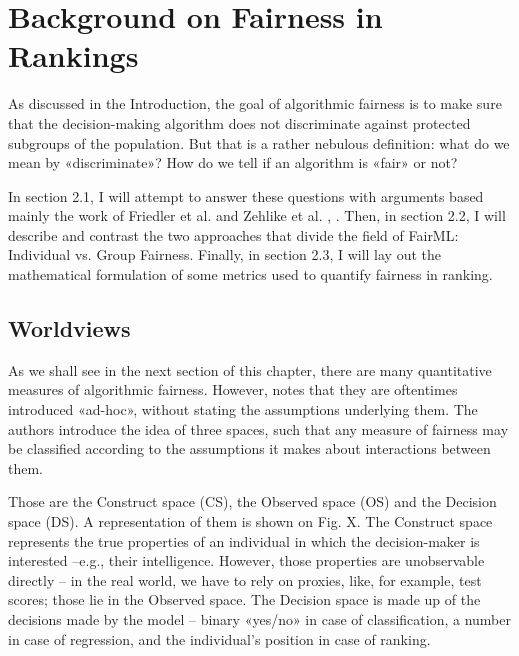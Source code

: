 
	
\newcommand{\ind}{\perp \!\!\! \perp}
\newcommand{\exposure}[1]{\textrm{Exposure}(#1|\mathbf{P})}

\chapter{Background on Fairness in Rankings}\label{chapt:background}


As discussed in the Introduction, the goal of algorithmic fairness is to make sure that the decision-making algorithm does not discriminate against protected subgroups of the population. But that is a rather nebulous definition: what do we mean by «discriminate»? How do we tell if an algorithm is «fair» or not?

In section 2.1, I will attempt to answer these questions with arguments based mainly the work of Friedler et al. \cite{1609.07236} and Zehlike et al. \cite{3533379}, \cite{3533380}. Then, in section 2.2, I will describe and contrast the two approaches that divide the field of FairML: Individual vs. Group Fairness. Finally, in section 2.3, I will lay out the mathematical formulation of some metrics used to quantify fairness in ranking.

\section{Worldviews}\label{sect:1_1}

As we shall see in the next section of this chapter, there are many quantitative measures of algorithmic fairness. However, \cite{1609.07236} notes that they are oftentimes introduced «ad-hoc», without stating the assumptions underlying them. The authors introduce the idea of three spaces, such that any measure of fairness may be classified according to the assumptions it makes about interactions between them.

Those are the Construct space (CS), the Observed space (OS) and the Decision space (DS). A representation of them is shown on Fig. X. The Construct space  represents the true properties of an individual in which the decision-maker is interested –e.g., their intelligence. However, those properties are unobservable directly – in the real world, we have to rely on proxies, like, for example, test scores; those lie in the Observed space. The Decision space is made up of the decisions made by the model – binary «yes/no» in case of classification, a number in case of regression, and the individual’s position in case of ranking.

